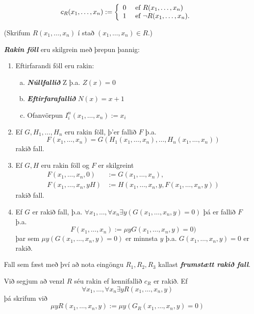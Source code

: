 \documentclass[12pt]{book}
\newcommand{\emphs}[1]{\textbf{\emph{#1}}}
\begin{document}
\[ c_R (x_1, \dotsc, x_n) := \left\{ \begin{array}{l l} 0 & \text{ ef } R(x_1, \dotsc,x_n) \\ 1 & \text{ ef } \lnot R(x_1,\dotsc,x_n).\\ \end{array} \right. \]

(Skrifum $R(x_1,\dotsc, x_n)$ í stað $(x_1, \dotsc, x_n) \in R$.)

\begin{skgr}
  \emphs{Rakin föll} eru skilgrein með þrepun þannig:

  \begin{enumerate}[R\arabic*]
  \item  Eftirfarandi föll eru rakin:
    \begin{enumerate}[(a)]
    \item \emphs{Núllfallið} Z þ.a. $Z(x) = 0$
    \item \emphs{Eftirfarafallið} $N(x) = x+1$
    \item Ofanvörpun $I_i^n(x_1, \dotsc, x_n) := x_i$
    \end{enumerate}
  \item Ef $G,H_1, \dotsc, H_n$ eru rakin föll, þ'er fallið
    $F$ þ.a.
    \[ F(x_1,\dotsc,x_n) = G(H_1(x_1,\dotsc,x_n), \dotsc, H_n(x_1,\dotsc,x_n))\]
    rakið fall.
  \item Ef $G,H$ eru rakin föll og $F$ er skilgreint
    \begin{align*}
      F(x_1, \dotsc, x_n,0) & := G(x_1, \dotsc,x_n),\\
      F(x_1, \dotsc,x_n, yH) & := H(x_1, \dotsc, x_n, y, F(x_1, \dotsc, x_n, y))
    \end{align*}
    rakið fall.
  \item Ef $G$ er rakið fall, þ.a. $\forall x_1, \dotsc, \forall x_n  \exists y (G(x_1, \dotsc, x_n,y) = 0)$
    þá er fallið $F$ þ.a. 
    \[ F(x_1, \dotsc, x_n) := \mu y G(x_1, \dotsc, x_n,y) = 0)\]
    þar sem $\mu y(G(x_1,\dotsc,x_n,y) = 0)$ er minnsta $y$ þ.a.
    $G(x_1,\dotsc,x_n,y) = 0$ er rakið.
  \end{enumerate}

 Fall sem fæst með því að nota eingöngu $R_1, R_2, R_3$ 
 kallast \emphs{frumstætt rakið fall}.

 Við segjum að venzl $R$ séu rakin ef kennifallið 
 $c_R$ er rakið. Ef \[\forall x_1, \dotsc, \forall x_n  \exists y R(x_1, \dotsc, x_n,y)\]
 þá skrifum við
 \[\mu y R (x_1, \dotsc, x_n,y) := \mu y (G_R(x_1,\dotsc,x_n,y) = 0)\]
\end{skgr}
\end{document}
